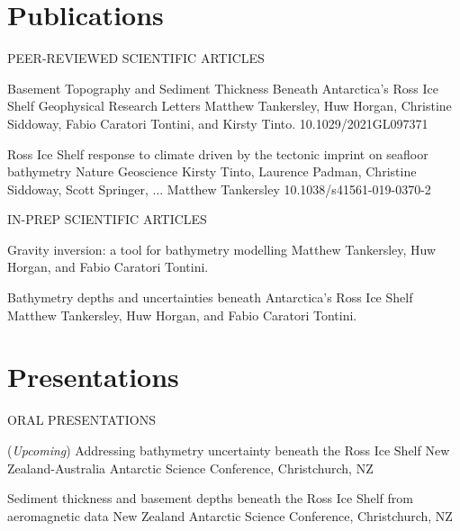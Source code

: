 \documentclass{ExpressiveResume}
\begin{document}
\section{Publications}
\noindent PEER-REVIEWED SCIENTIFIC ARTICLES \newline

\begin{cventries}
    {Basement Topography and Sediment Thickness Beneath Antarctica’s Ross Ice Shelf}
    {Geophysical Research Letters}
    {Matthew Tankersley, Huw Horgan, Christine Siddoway, Fabio Caratori Tontini, and Kirsty Tinto.}
    {10.1029/2021GL097371}

    {Ross Ice Shelf response to climate driven by the tectonic
        imprint on seafloor bathymetry}
    {Nature Geoscience}
    {Kirsty Tinto, Laurence Padman, Christine Siddoway, Scott Springer, ... Matthew Tankersley}
    {10.1038/s41561-019-0370-2}
\end{cventries}


\noindent IN-PREP SCIENTIFIC ARTICLES \newline

\begin{cventries}
    {Gravity inversion: a tool for bathymetry modelling}
    {Matthew Tankersley, Huw Horgan, and Fabio Caratori Tontini.}

    {Bathymetry depths and uncertainties beneath Antarctica's Ross Ice Shelf}
    {Matthew Tankersley, Huw Horgan, and Fabio Caratori Tontini.}

\end{cventries}


\section{Presentations}
\noindent ORAL PRESENTATIONS \newline

\begin{cventries}
    {(\textit{Upcoming}) Addressing bathymetry uncertainty beneath the Ross Ice Shelf}
    {New Zealand-Australia Antarctic Science Conference, Christchurch, NZ}
    {}
    {}

    {Sediment thickness and basement depths beneath the Ross Ice Shelf from aeromagnetic data}
    {New Zealand Antarctic Science Conference, Christchurch, NZ}
    {}
    {}

\end{cventries}
\end{document}

